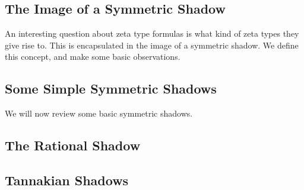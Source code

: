 \subsection{The Image of a Symmetric Shadow}
An interesting question about zeta type formulas is what kind of zeta types they give rise to. This is encapsulated in the image of a symmetric shadow. We define this concept, and make some basic observations.

\subsection{Some Simple Symmetric Shadows}
We will now review some basic symmetric shadows.

\subsection{The Rational Shadow}

\subsection{Tannakian Shadows}
